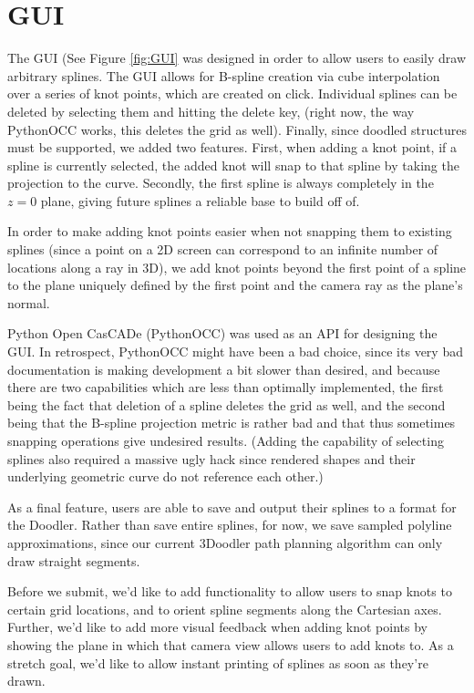 \documentclass[conference]{acmsiggraph}
\begin{document}
\section{GUI}
The GUI (See Figure \ref{fig:GUI} was designed in order to allow users to easily draw arbitrary splines.  The GUI allows for B-spline creation via cube interpolation over a series of knot points, which are created on click.  Individual splines can be deleted by selecting them and hitting the delete key, (right now, the way PythonOCC works, this deletes the grid as well).  Finally, since doodled structures must be supported, we added two features.  First, when adding a knot point, if a spline is currently selected, the added knot will snap to that spline by taking the projection to the curve.  Secondly, the first spline is always completely in the $z=0$ plane, giving future splines a reliable base to build off of.

In order to make adding knot points easier when not snapping them to existing splines (since a point on a 2D screen can correspond to an infinite number of locations along a ray in 3D), we add knot points beyond the first point of a spline to the plane uniquely defined by the first point and the camera ray as the plane's normal.

Python Open CasCADe (PythonOCC) was used as an API for designing the GUI.  In retrospect, PythonOCC might have been a bad choice, since its very bad documentation is making development a bit slower than desired, and because there are two capabilities which are less than optimally implemented, the first being the fact that deletion of a spline deletes the grid as well, and the second being that the B-spline projection metric is rather bad and that thus sometimes snapping operations give undesired results.  (Adding the capability of selecting splines also required a massive ugly hack since rendered shapes and their underlying geometric curve do not reference each other.)

As a final feature, users are able to save and output their splines to a format for the Doodler.  Rather than save entire splines, for now, we save sampled polyline approximations, since our current 3Doodler path planning algorithm can only draw straight segments.

Before we submit, we'd like to add functionality to allow users to snap knots to certain grid locations, and to orient spline segments along the Cartesian axes.  Further, we'd like to add more visual feedback when adding knot points by showing the plane in which that camera view allows users to add knots to.  As a stretch goal, we'd like to allow instant printing of splines as soon as they're drawn.
\end{document}
